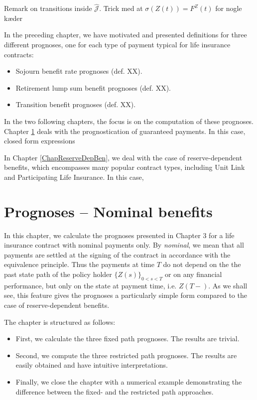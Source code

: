 \documentclass{book}
\newcommand{\1}[1]{\mathbbm{1}_{\left\lbrace #1 \right\rbrace}}
\theoremstyle{break}
\theoremstyle{remark}
\newenvironment{remark}
  {\pushQED{\qed}\renewcommand{\qedsymbol}{\scalebox{1.4}{$\circ$}}\remarkx}
  {\popQED\endremarkx}
\numberwithin{equation}{section}
\begin{document}
\begin{remark}
Remark on transitions inside $\hat{\mathcal{J}}$. Trick med at $\sigma(Z(t))=F^Z(t)$ for nogle kæder
\end{remark}

In the preceding chapter, we have motivated and presented definitions for three different prognoses, one for each type of payment typical for life insurance contracts:

\begin{itemize}
	\item Sojourn benefit rate prognoses (def. XX).
	\item Retirement lump sum benefit prognoses (def. XX).
	\item Transition benefit prognoses (def. XX).
\end{itemize}

In the two following chapters, the focus is on the computation of these prognoses. Chapter \ref{ChapGuaranteedBen} deals with the prognostication of guaranteed payments. In this case, closed form expressions

In Chapter \ref{ChapReserveDepBen}, we deal with the case of reserve-dependent benefits, which encompasses many popular contract types, including Unit Link and Participating Life Insurance. In this case, 

\chapter{Prognoses -- Nominal benefits} \label{ChapGuaranteedBen}

In this chapter, we calculate the prognoses presented in Chapter 3 for a life insurance contract with nominal payments only. By \textit{nominal}, we mean that all payments are settled at the signing of the contract in accordance with the equivalence principle. Thus the payments at time $T$ do not depend on the the past state path of the policy holder $\{ Z(s) \}_{0 < s < T}$ or on any financial performance, but only on the state at payment time,  i.e. $Z(T-)$. As we shall see, this feature gives the prognoses a particularly simple form compared to the case of reserve-dependent benefits.

The chapter is structured as follows:

\begin{itemize}
	\item First, we calculate the three fixed path prognoses. The results are trivial.
	\item Second, we compute the three restricted path prognoses. The results are easily obtained and have intuitive interpretations.
	\item Finally, we close the chapter with a numerical example demonstrating the difference between the fixed- and the restricted path approaches.
\end{itemize}
\end{document}
